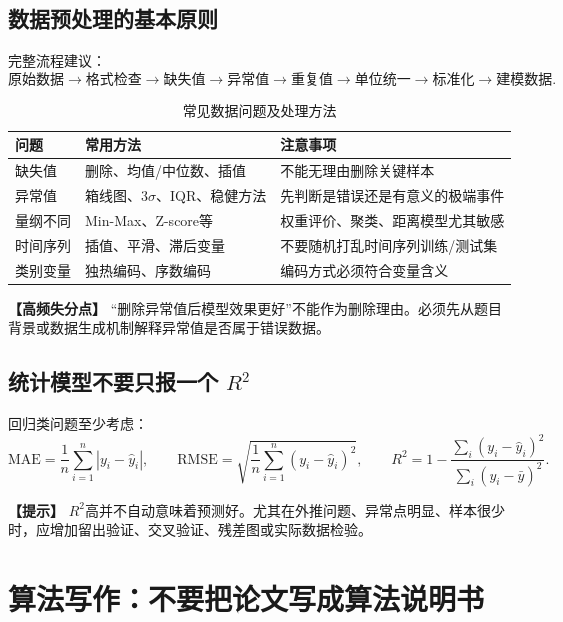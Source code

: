 \documentclass[12pt,a4paper]{article}
\newcommand{\tip}[1]{\par\noindent\textbf{【提示】} #1\par}
\newcommand{\warning}[1]{\par\noindent\textbf{【高频失分点】} #1\par}
\begin{document}
\subsection{数据预处理的基本原则}

完整流程建议：
\[
\text{原始数据}
\rightarrow\text{格式检查}
\rightarrow\text{缺失值}
\rightarrow\text{异常值}
\rightarrow\text{重复值}
\rightarrow\text{单位统一}
\rightarrow\text{标准化}
\rightarrow\text{建模数据}.
\]

\begin{table}[H]
\centering
\caption{常见数据问题及处理方法}
\begin{tabular}{p{1.8cm}p{6cm}p{7cm}}
\toprule
问题 & 常用方法 & 注意事项 \\
\midrule
缺失值 & 删除、均值/中位数、插值 & 不能无理由删除关键样本 \\
异常值 & 箱线图、3$\sigma$、IQR、稳健方法 & 先判断是错误还是有意义的极端事件 \\
量纲不同 & Min-Max、Z-score等 & 权重评价、聚类、距离模型尤其敏感 \\
时间序列 & 插值、平滑、滞后变量 & 不要随机打乱时间序列训练/测试集 \\
类别变量 & 独热编码、序数编码 & 编码方式必须符合变量含义 \\
\bottomrule
\end{tabular}
\end{table}

\warning{“删除异常值后模型效果更好”不能作为删除理由。必须先从题目背景或数据生成机制解释异常值是否属于错误数据。}

\subsection{统计模型不要只报一个 $R^2$}

回归类问题至少考虑：
\[
\mathrm{MAE}=\frac1n\sum_{i=1}^n|y_i-\hat y_i|,
\qquad
\mathrm{RMSE}=\sqrt{\frac1n\sum_{i=1}^n(y_i-\hat y_i)^2},
\qquad
R^2=1-\frac{\sum_i(y_i-\hat y_i)^2}{\sum_i(y_i-\bar y)^2}.
\]

\tip{$R^2$高并不自动意味着预测好。尤其在外推问题、异常点明显、样本很少时，应增加留出验证、交叉验证、残差图或实际数据检验。}

\section{算法写作：不要把论文写成算法说明书}
\end{document}
